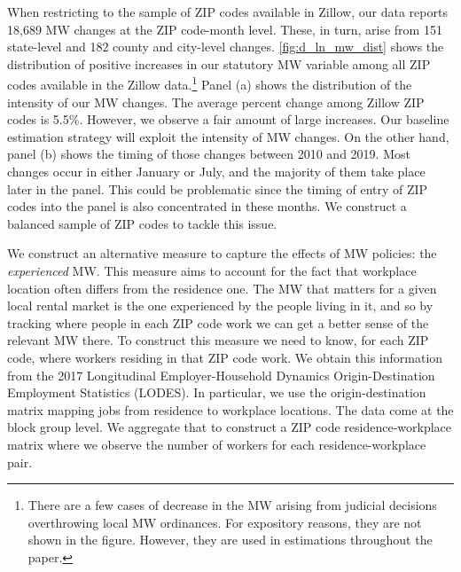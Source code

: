 When restricting to the sample of ZIP codes available in Zillow, our data reports 18,689 
MW changes at the ZIP code-month level. These, in turn, arise from 151 state-level and 182 
county and city-level changes. \autoref{fig:d_ln_mw_dist} shows the distribution of 
positive increases in our statutory MW variable among all ZIP codes available in the 
Zillow data.\footnote{There are a few cases of decrease in the MW arising from judicial 
	decisions overthrowing local MW ordinances. For expository reasons, they are not shown 
	in the figure. However, they are used in estimations throughout the paper.}
Panel (a) shows the distribution of the intensity of our MW changes. The average percent 
change among Zillow ZIP codes is 5.5\%. %
However, we observe a fair amount of large increases. Our baseline estimation strategy will
exploit the intensity of MW changes. On the other hand, panel (b) shows the timing of 
those changes between 2010 and 2019. Most changes occur in either January or July, 
and the majority of them take place later in the panel. This could be problematic since
the timing of entry of ZIP codes into the panel is also concentrated in these months. We 
construct a balanced sample of ZIP codes to tackle this issue.

We construct an alternative measure to capture the effects of MW policies: the 
\textit{experienced} MW. This measure aims to account for the fact that workplace location 
often differs from the residence one. The MW that matters for a given local rental market 
is the one experienced by the people living in it, and so by tracking where people in 
each ZIP code work we can get a better sense of the relevant MW there.
To construct this measure we need to know, for each ZIP code, where workers residing in 
that ZIP code work. We obtain this information from the 2017 Longitudinal Employer-Household 
Dynamics Origin-Destination Employment Statistics (LODES). In particular, we use the 
origin-destination matrix mapping jobs from residence to workplace locations. The data 
come at the block group level. We aggregate that to construct a ZIP code residence-workplace 
matrix where we observe the number of workers for each residence-workplace pair.

